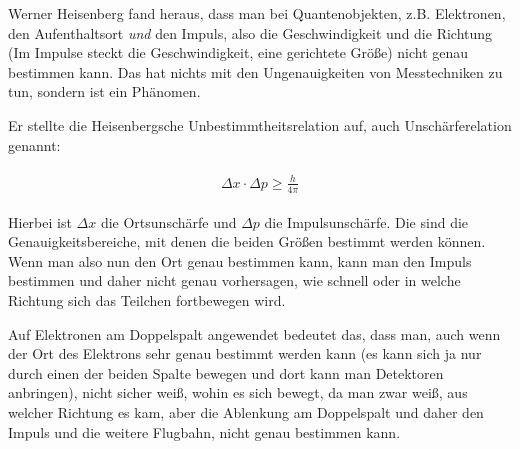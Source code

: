 Werner Heisenberg fand heraus, dass man bei Quantenobjekten, z.B. Elektronen, den Aufenthaltsort \emph{und} den Impuls, also die Geschwindigkeit und die Richtung (Im Impulse steckt die Geschwindigkeit, eine gerichtete Größe) nicht genau bestimmen kann. Das hat nichts mit den Ungenauigkeiten von Messtechniken zu tun, sondern ist ein Phänomen.

Er stellte die Heisenbergsche Unbestimmtheitsrelation auf, auch Unschärferelation genannt:

\begin{align}
\begin{split}
	\Delta x \cdot \Delta p \ge \frac{h}{4\pi}
\end{split}
\end{align}

Hierbei ist $\Delta x$ die Ortsunschärfe und $\Delta p$ die Impulsunschärfe. Die sind die Genauigkeitsbereiche, mit denen die beiden Größen bestimmt werden können. Wenn man also nun den Ort genau bestimmen kann, kann man den Impuls bestimmen und daher nicht genau vorhersagen, wie schnell oder in welche Richtung sich das Teilchen fortbewegen wird.

Auf Elektronen am Doppelspalt angewendet bedeutet das, dass man, auch wenn der Ort des Elektrons sehr genau bestimmt werden kann (es kann sich ja nur durch einen der beiden Spalte bewegen und dort kann man Detektoren anbringen), nicht sicher weiß, wohin es sich bewegt, da man zwar weiß, aus welcher Richtung es kam, aber die Ablenkung am Doppelspalt und daher den Impuls und die weitere Flugbahn, nicht genau bestimmen kann.
